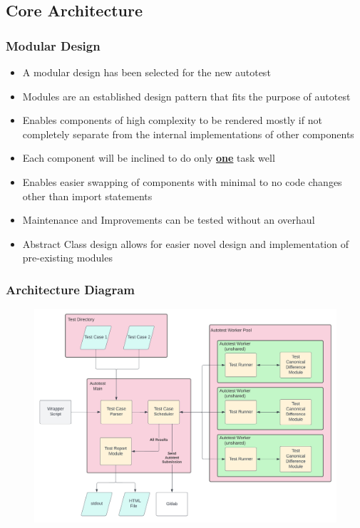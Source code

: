 \documentclass[xcolor]{beamer}
\begin{document}
\subsection{Core Architecture}
\begin{frame}
	\frametitle{Modular Design}
	\begin{itemize}
		\item A modular design has been selected for the new autotest
		\pause
		\item Modules are an established design pattern that fits the purpose of autotest
		\pause
		\item Enables components of high complexity to be rendered mostly if not completely separate from the internal implementations of other components
		\pause
		\item Each component will be inclined to do only \textbf{\underline{one}} task well
		\pause
		\item Enables easier swapping of components with minimal to no code changes other than import statements
		\pause
		\item Maintenance and Improvements can be tested without an overhaul
		\pause
		\item Abstract Class design allows for easier novel design and implementation of pre-existing modules
	\end{itemize}
\end{frame}

\begin{frame}
	\frametitle{Architecture Diagram}
	\begin{figure}
		\includegraphics[width=\textwidth, height=0.85\textheight, keepaspectratio=true]{architecture}
	\end{figure}
\end{frame}
\end{document}
